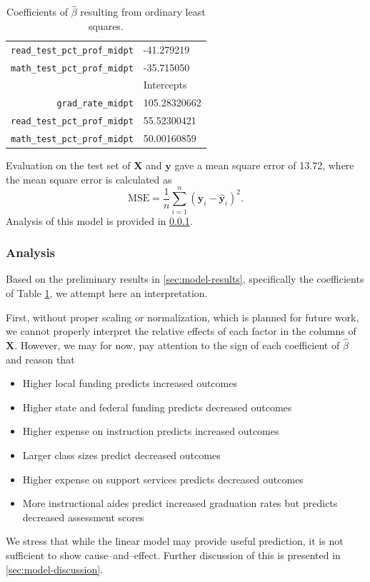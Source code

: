 \documentclass{article}
\newcommand*\rot{\multicolumn{1}{R{0}{1em}}}%
\renewcommand*\rot{}
\begin{document}
\begin{table}[H]
\begin{tabular}{r|l}
\texttt{read\_test\_pct\_prof\_midpt} &	-41.279219  \\
\texttt{math\_test\_pct\_prof\_midpt} &	-35.715050  \\ \hline
& \rot{Intercepts} \\ \hline
\texttt{grad\_rate\_midpt}            &  105.28320662  \\
\texttt{read\_test\_pct\_prof\_midpt} &	 55.52300421   \\
\texttt{math\_test\_pct\_prof\_midpt} &	 50.00160859   \\ 
\end{tabular}
\caption{Coefficients of \(\hat{\beta}\) resulting from ordinary least squares.}
\label{tab:model}
\end{table}

Evaluation on the test set of \(\mathbf{X}\) and \(\textbf{y}\) gave a mean square error of 13.72, where the mean square error is calculated as
\begin{equation*}
    \text{MSE} = \frac{1}{n} \sum_{i=1}^{n} \left(\mathbf{y}_i - \mathbf{\hat{y}}_i\right)^2.
\end{equation*}
Analysis of this model is provided in \ref{sec:model-analysis}.

\subsubsection{Analysis}\label{sec:model-analysis}
Based on the preliminary results in \ref{sec:model-results}, specifically the coefficients of Table \ref{tab:model}, we attempt here an interpretation. 

First, without proper scaling or normalization, which is planned for future work, we cannot properly interpret the relative effects of each factor in the columns of \(\mathbf{X}\). However, we may for now, pay attention to the sign of each coefficient of \(\hat{\beta}\) and reason that
\begin{itemize}
    \item Higher local funding predicts increased outcomes
    \item Higher state and federal funding predicts decreased outcomes
    \item Higher expense on instruction predicts increased outcomes
    \item Larger class sizes predict decreased outcomes
    \item Higher expense on support services predicts decreased outcomes 
    \item More instructional aides predict increased graduation rates but predicts decreased assessment scores
\end{itemize}
We stress that while the linear model may provide useful prediction, it is not sufficient to show cause--and--effect. Further discussion of this is presented in \ref{sec:model-discussion}.
\end{document}
